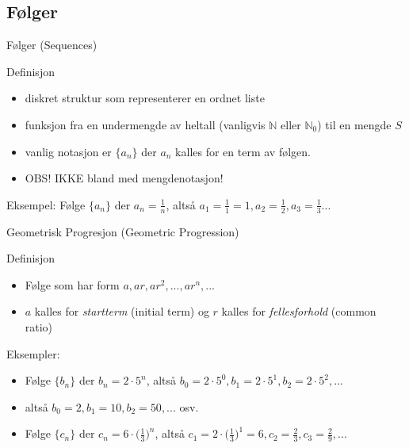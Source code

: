 \subsection*{Følger}

\begin{frame}{Følger (Sequences)}
    \pause
    \begin{block}{Definisjon}
        \begin{itemize}
            \item diskret struktur som representerer en ordnet liste\\
            \item funksjon fra en undermengde av heltall (vanligvis $\mathbb{N}$ eller $\mathbb{N}_0$) til en mengde $S$\\
            \item vanlig notasjon er $\{a_n\}$ der $a_n$ kalles for en term av følgen.
            \item OBS! IKKE bland med mengdenotasjon!
        \end{itemize}
    \end{block}
    \pause
    Eksempel: Følge $\{a_n\}$ der $a_n = \frac{1}{n}$, altså $a_1 = \frac{1}{1} = 1, a_2 = \frac{1}{2}, a_3 = \frac{1}{3}...$\\
\end{frame}

\begin{frame}{Geometrisk Progresjon (Geometric Progression)}
    \pause
    \begin{block}{Definisjon}
        \begin{itemize}
            \item Følge som har form $a, ar, ar^2, ..., ar^n, ...$
            \item $a$ kalles for \textit{startterm} (initial term) og $r$ kalles for \textit{fellesforhold} (common ratio)
        \end{itemize}
    \end{block}
    \pause
    Eksempler:\\
    \begin{itemize}
        \item Følge $\{b_n\}$ der $b_n = 2 \cdot 5^n$, altså $b_0 = 2 \cdot 5^0, b_1 = 2 \cdot 5^1, b_2 = 2 \cdot 5^2, ...$
        \pause
        \item altså $b_0 = 2, b_1 = 10, b_2 = 50, ...$ osv.
        \pause
        \item Følge $\{c_n\}$ der $c_n = 6 \cdot \big( \frac{1}{3} \big)^n$, altså $c_1 = 2 \cdot \big( \frac{1}{3} \big)^1 = 6, c_2 = \frac{2}{3}, c_3 = \frac{2}{9}, ...$
    \end{itemize}
\end{frame}

